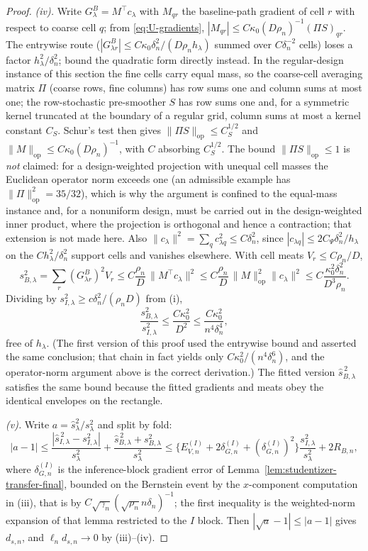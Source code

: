 \documentclass[11pt]{article}
\theoremstyle{definition}
\newcommand{\1}{\mathbf 1}\newcommand{\op}{\operatorname}
\begin{document}
\begin{proof}
\emph{(iv).}  Write $G^{B}_{\lambda}=M^\top c_\lambda$ with
$M_{qr}$ the baseline-path gradient of cell $r$ with respect to coarse cell
$q$; from \eqref{eq:U-gradients}, $|M_{qr}|\le C\kappa_0(D\rho_n)^{-1}(\Pi S)_{qr}$.
The entrywise route ($|G^B_{\lambda r}|\le C\kappa_0\delta_n^2/(D\rho_nh_\lambda)$
summed over $C\delta_n^{-2}$ cells) loses a factor $h_\lambda^2/\delta_n^2$;
bound the quadratic form directly instead.  In the regular-design instance of
this section the fine cells carry equal mass, so the coarse-cell averaging
matrix $\Pi$ (coarse rows, fine columns) has row sums one and column sums at
most one; the row-stochastic pre-smoother $S$ has row sums one and, for a
symmetric kernel truncated at the boundary of a regular grid, column sums at
most a kernel constant $C_S$.  Schur's test then gives
$\|\Pi S\|_{\mathrm{op}}\le C_S^{1/2}$ and
$\|M\|_{\mathrm{op}}\le C\kappa_0(D\rho_n)^{-1}$, with $C$ absorbing
$C_S^{1/2}$.  The bound $\|\Pi S\|_{\mathrm{op}}\le1$ is \emph{not} claimed:
for a design-weighted projection with unequal cell masses the Euclidean
operator norm exceeds one (an admissible example has $\|\Pi\|^2_{\mathrm{op}}=35/32$),
which is why the argument is confined to the equal-mass instance and, for a
nonuniform design, must be carried out in the design-weighted inner product,
where the projection is orthogonal and hence a contraction; that extension is
not made here.  Also
$\|c_\lambda\|^2=\sum_qc_{\lambda q}^2\le C\delta_n^2$, since
$|c_{\lambda q}|\le2C_\Psi\delta_n^2/h_\lambda$ on the $Ch_\lambda^2/\delta_n^2$
support cells and vanishes elsewhere.  With cell meats
$V_r\le C\rho_n/D$,
\[
s_{B,\lambda}^2=\sum_r(G^B_{\lambda r})^2V_r
\le C\frac{\rho_n}{D}\,\|M^\top c_\lambda\|^2
\le C\frac{\rho_n}{D}\,\|M\|_{\mathrm{op}}^2\|c_\lambda\|^2
\le C\frac{\kappa_0^2\delta_n^2}{D^3\rho_n}.
\]
Dividing by $s_{I,\lambda}^2\ge c\delta_n^2/(\rho_nD)$ from (i),
\[
\frac{s_{B,\lambda}^2}{s_{I,\lambda}^2}\le\frac{C\kappa_0^2}{D^2}
\le\frac{C\kappa_0^2}{n^4\delta_n^4},
\]
free of $h_\lambda$.  (The first version of this proof used the entrywise
bound and asserted the same conclusion; that chain in fact yields only
$C\kappa_0^2/(n^4\delta_n^6)$, and the operator-norm argument above is the
correct derivation.)  The fitted
version $\widehat s_{B,\lambda}^{\,2}$ satisfies the same bound because the
fitted gradients and meats obey the identical envelopes on the rectangle.

\emph{(v).}  Write $a=\widehat s_\lambda^2/s_\lambda^2$ and split by fold:
\[
|a-1|\le
\frac{|\widehat s_{I,\lambda}^{\,2}-s_{I,\lambda}^2|}{s_\lambda^2}
+\frac{\widehat s_{B,\lambda}^{\,2}+s_{B,\lambda}^2}{s_\lambda^2}
\le\bigl\{E^{(I)}_{V,n}+2\delta_{G,n}^{(I)}+(\delta_{G,n}^{(I)})^2\bigr\}
\frac{s_{I,\lambda}^2}{s_\lambda^2}+2R_{B,n},
\]
where $\delta^{(I)}_{G,n}$ is the inference-block gradient error of
Lemma~\ref{lem:studentizer-transfer-final}, bounded on the Bernstein event by
the $x$-component computation in (iii), that is by
$C\sqrt{\gamma_n}(\sqrt{\rho_n}n\delta_n)^{-1}$; the first inequality is the
weighted-norm expansion of that lemma restricted to the $I$ block.  Then
$|\sqrt a-1|\le|a-1|$ gives $d_{s,n}$, and $\ell_nd_{s,n}\to0$ by (iii)--(iv).


\end{proof}
\end{document}
